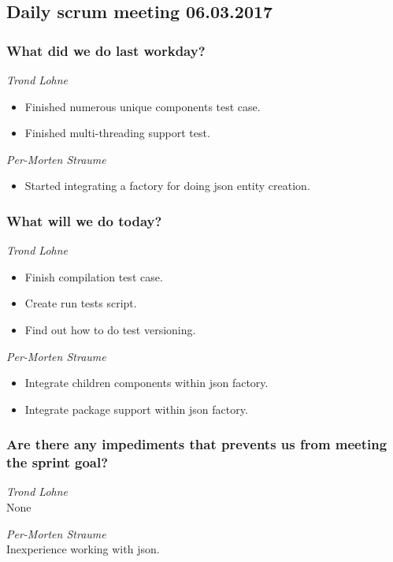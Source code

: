 \documentclass{article}
\begin{document}
\begin{center}
\subsection*{Daily scrum meeting 06.03.2017}
\end{center}
\bigskip


\subsubsection*{What did we do last workday?}

\noindent\textit{Trond Lohne}
\begin{itemize}
	\item 
	Finished numerous unique components test case.
	
	\item 
	Finished multi-threading support test.
\end{itemize}

\medskip

\noindent\textit{Per-Morten Straume}
\begin{itemize}
	\item 
	Started integrating a factory for doing json entity creation.
\end{itemize}


\subsubsection*{What will we do today?}

\noindent\textit{Trond Lohne}
\begin{itemize}
	\item 
	Finish compilation test case.
	
	\item 
    Create run tests script.
    
    \item 
    Find out how to do test versioning.	
\end{itemize}

\medskip

\noindent\textit{Per-Morten Straume}
\begin{itemize}
	\item 
	Integrate children components within json factory.
	
	\item 
	Integrate package support within json factory.	
\end{itemize}


\subsubsection*{Are there any impediments that prevents us from meeting the sprint goal?}

\noindent\textit{Trond Lohne}\\
None

\medskip

\noindent\textit{Per-Morten Straume}\\
Inexperience working with json.
\end{document}
